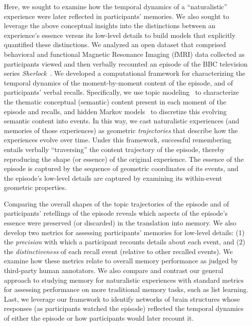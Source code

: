 \documentclass{article}
\begin{document}
Here, we sought to examine how the temporal dynamics of a ``naturalistic'' experience were later reflected in participants' memories.  We also sought to leverage the above conceptual insights into the distinctions between an experience's essence versus its low-level details to build models that explicitly quantified these distinctions.  We analyzed an open dataset that comprised behavioral and functional Magnetic Resonance Imaging (fMRI) data collected as participants viewed and then verbally recounted an episode of the BBC television series \textit{Sherlock}~\citep{ChenEtal17}.  We developed a computational framework for characterizing the temporal dynamics of the moment-by-moment content of the episode, and of participants' verbal recalls.  Specifically, we use topic modeling~\citep{BleiEtal03} to characterize the thematic conceptual (semantic) content present in each moment of the episode and recalls, and hidden Markov models~\citep{Rabi89, BaldEtal17} to discretize this evolving semantic content into events.  In this way, we cast naturalistic experiences (and memories of those experiences) as geometric \textit{trajectories} that describe how the experiences evolve over time. Under this framework, successful remembering entails verbally ``traversing'' the content trajectory of the episode, thereby reproducing the shape (or essence) of the original experience.  The essence of the episode is captured by the sequence of geometric coordinates of its events, and the episode's low-level details are captured by examining its within-event geometric properties.

Comparing the overall shapes of the topic trajectories of the episode and of participants' retellings of the episode reveals which aspects of the episode's essence were preserved (or discarded) in the translation into memory.  We also develop two metrics for assessing participants' memories for low-level details: (1) the \textit{precision} with which a participant recounts details about each event, and (2) the \textit{distinctiveness} of each recall event (relative to other recalled events).  We examine how these metrics relate to overall memory performance as judged by third-party human annotators.  We also compare and contrast our general approach to studying memory for naturalistic experiences with standard metrics for assessing performance on more traditional memory tasks, such as list learning.  Last, we leverage our framework to identify networks of brain structures whose responses (as participants watched the episode) reflected the temporal dynamics of either the episode or how participants would later recount it.
\end{document}
